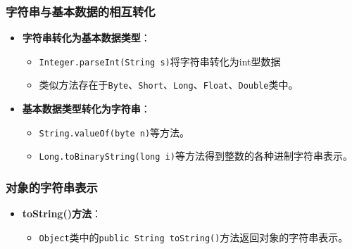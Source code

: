 \documentclass[a4paper, 10pt]{ctexart}
\begin{document}
\subsubsection{字符串与基本数据的相互转化}
\begin{itemize}
  \item \textbf{字符串转化为基本数据类型}：
  \begin{itemize}
    \item \texttt{Integer.parseInt(String s)}将字符串转化为int型数据
    \item 类似方法存在于\texttt{Byte}、\texttt{Short}、\texttt{Long}、\texttt{Float}、\texttt{Double}类中。
  \end{itemize}
  \item \textbf{基本数据类型转化为字符串}：
  \begin{itemize}
    \item \texttt{String.valueOf(byte n)}等方法。
    \item \texttt{Long.toBinaryString(long i)}等方法得到整数的各种进制字符串表示。
  \end{itemize}
\end{itemize}

\subsubsection{对象的字符串表示}
\begin{itemize}
  \item \textbf{toString()方法}：
  \begin{itemize}
    \item \texttt{Object}类中的\texttt{public String toString()}方法返回对象的字符串表示。
  \end{itemize}
\end{itemize}
\end{document}
